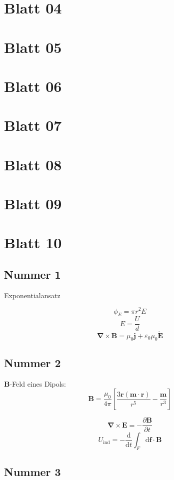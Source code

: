 \documentclass[titlepage,11pt,a4paper,ngerman]{report}
\newcommand{\dd}{\mathrm{d}}
\renewcommand{\vec}[1]{\bm{#1}}
\newcommand{\vepsilon}{\varepsilon}
\begin{document}
\section{Blatt 04}

\section{Blatt 05}

\section{Blatt 06}

\section{Blatt 07}

\section{Blatt 08}

\section{Blatt 09}


\section{Blatt 10}

\subsection{Nummer 1}

Exponentialansatz

\[\phi_E=\pi r^2 E\]
\[E=\frac{U}{d}\]
\[\vec{\nabla}\times\vec{B}=\mu_0\vec{j}+\vepsilon_0\mu_0\dot{\vec{E}}\]

\subsection{Nummer 2}

$\vec{B}$-Feld eines Dipols:
\[\vec{B}=\frac{\mu_0}{4\pi}\left[\frac{3\vec{r}(\vec{m}\cdot\vec{r})}{r^5}-\frac{\vec{m}}{r^3}\right]\]

\[\vec{\nabla}\times\vec{E}=-\frac{\partial\vec{B}}{\partial t}\]
\[U_\mathrm{ind}=-\frac{\dd}{\dd t}\int_F\dd\vec{f}\cdot\vec{B}\]

\subsection{Nummer 3}
\end{document}
